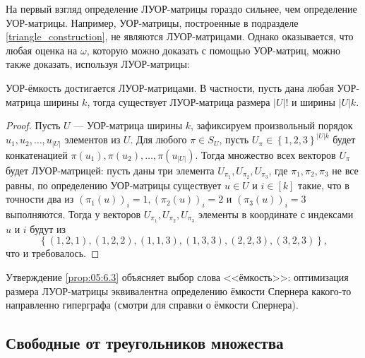 На первый взгляд определение ЛУОР-матрицы гораздо сильнее, чем определение УОР-матрицы. Например, УОР-матрицы, построенные в подразделе \ref{triangle_construction}, не являются ЛУОР-матрицами. Однако оказывается, что любая оценка на $\omega$, которую можно доказать с помощью УОР-матриц, можно также доказать, используя ЛУОР-матрицы:
\begin{prop}
  \label{prop:05:6.3} УОР-ёмкость достигается ЛУОР-матрицами. В частности, пусть дана любая УОР-матрица ширины $k$, тогда существует ЛУОР-матрица размера $|U|!$ и ширины $|U|k$.
\end{prop}
\begin{proof}
Пусть $U$ --- УОР-матрица ширины $k$, зафиксируем произвольный порядок $u_1,u_2,\dotsc,u_{|U|}$ элементов из $U$. Для любого $\pi \in S_U$, пусть $U_\pi \in \left\{ 1,2,3 \right\}^{|U|k}$ будет конкатенацией $\pi(u_1), \pi(u_2), \dotsc, \pi(u_{|U|})$. Тогда множество всех векторов $U_{\pi}$ будет ЛУОР-матрицей: пусть даны три элемента $U_{\pi_1}, U_{\pi_2}, U_{\pi_3}$, где $\pi_1, \pi_2, \pi_3$ не все равны, по определению УОР-матрицы существует $u \in U$ и $i \in [k]$ такие, что в точности два из $(\pi_1(u))_i=1, (\pi_2(u))_i=2$ и $(\pi_3(u))_i=3$ выполняются. Тогда у векторов $U_{\pi_1}, U_{\pi_2}, U_{\pi_3}$ элементы в координате с индексами $u$ и $i$ будут из 
\[
\left\{ (1,2,1), (1,2,2), (1,1,3), (1,3,3), (2,2,3), (3,2,3) \right\},
\] что и требовалось.
\end{proof}

Утверждение \ref{prop:05:6.3} объясняет выбор слова <<ёмкость>>: оптимизация размера ЛУОР-матрицы эквивалентна определению ёмкости Спернера какого-то направленно гиперграфа (смотри \cite{Sim01} для справки о ёмкости Спернера).

\subsection{Свободные от треугольников множества}

